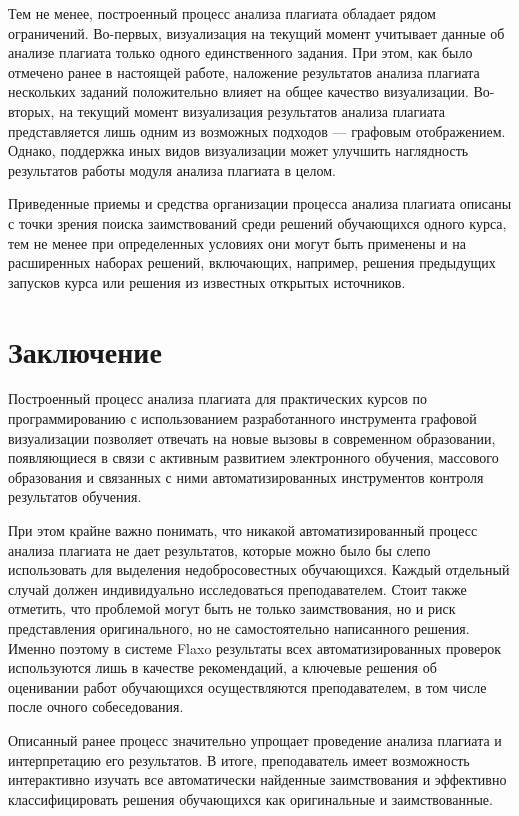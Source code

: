 \documentclass[a4paper,14pt]{extarticle}
\begin{document}
Тем не менее, построенный процесс анализа плагиата обладает рядом ограничений. Во-первых, визуализация на текущий момент учитывает данные об анализе плагиата только одного единственного задания. При этом, как было отмечено ранее в настоящей работе, наложение результатов анализа плагиата нескольких заданий положительно влияет на общее качество визуализации. Во-вторых, на текущий момент визуализация результатов анализа плагиата представляется лишь одним из возможных подходов --- графовым отображением. Однако, поддержка иных видов визуализации может улучшить наглядность результатов работы модуля анализа плагиата в целом.

Приведенные приемы и средства организации процесса анализа плагиата описаны с точки зрения поиска заимствований среди решений обучающихся одного курса, тем не менее при определенных условиях они могут быть применены и на расширенных наборах решений, включающих, например, решения предыдущих запусков курса или решения из известных открытых источников.

\section{Заключение}

Построенный процесс анализа плагиата для практических курсов по программированию с использованием разработанного инструмента графовой визуализации позволяет отвечать на новые вызовы в современном образовании, появляющиеся в связи с активным развитием электронного обучения, массового образования и связанных с ними автоматизированных инструментов контроля результатов обучения.

При этом крайне важно понимать, что никакой автоматизированный процесс анализа плагиата не дает результатов, которые можно было бы слепо использовать для выделения недобросовестных обучающихся. Каждый отдельный случай должен индивидуально исследоваться преподавателем. Стоит также отметить, что проблемой могут быть не только заимствования, но и риск представления оригинального, но не самостоятельно написанного решения. Именно поэтому в системе Flaxo результаты всех автоматизированных проверок используются лишь в качестве рекомендаций, а ключевые решения об оценивании работ обучающихся осуществляются преподавателем, в том числе после очного собеседования.

Описанный ранее процесс значительно упрощает проведение анализа плагиата и интерпретацию его результатов. В итоге, преподаватель имеет возможность интерактивно изучать все автоматически найденные заимствования и эффективно классифицировать решения обучающихся как оригинальные и заимствованные.



\end{document}
